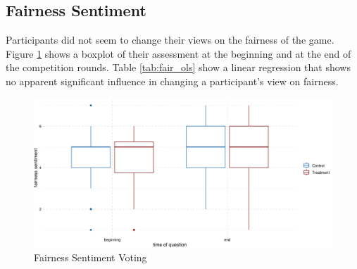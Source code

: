 \subsection{Fairness Sentiment}

Participants did not seem to change their views on the fairness of the game. Figure \ref{fig:fairness_boxplot} shows a boxplot of their assessment at the beginning and at the end of the competition rounds. Table \ref{tab:fair_ols} show a linear regression that shows no apparent significant influence in changing a participant's view on fairness.\\

\begin{figure}
    \centering
    \includegraphics[width=\textwidth]{fairness_sentiment_boxplot.png}
    \caption{Fairness Sentiment Voting}
    \label{fig:fairness_boxplot}
\end{figure}



